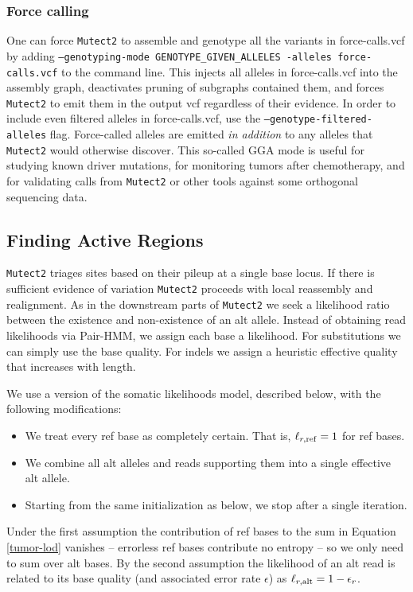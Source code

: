 \documentclass[nofootinbib,amssymb,amsmath]{revtex4}
\newcommand{\code}[1]{\texttt{#1}}
\begin{document}
\subsubsection{Force calling}
One can force \code{Mutect2} to assemble and genotype all the variants in force-calls.vcf by adding \code{--genotyping-mode GENOTYPE\_GIVEN\_ALLELES -alleles force-calls.vcf} to the command line.  This injects all alleles in force-calls.vcf into the assembly graph, deactivates pruning of subgraphs contained them, and forces \code{Mutect2} to emit them in the output vcf regardless of their evidence.  In order to include even filtered alleles in force-calls.vcf, use the \code{--genotype-filtered-alleles} flag.  Force-called alleles are emitted \textit{in addition} to any alleles that \code{Mutect2} would otherwise discover.  This so-called GGA mode is useful for studying known driver mutations, for monitoring tumors after chemotherapy, and for validating calls from \code{Mutect2} or other tools against some orthogonal sequencing data.

\subsection{Finding Active Regions}
\code{Mutect2} triages sites based on their pileup at a single base locus.  If there is sufficient evidence of variation \code{Mutect2} proceeds with local reassembly and realignment.  As in the downstream parts of \code{Mutect2} we seek a likelihood ratio between the existence and non-existence of an alt allele.  Instead of obtaining read likelihoods via Pair-HMM, we assign each base a likelihood.  For substitutions we can simply use the base quality.  For indels we assign a heuristic effective quality that increases with length.

We use a version of the somatic likelihoods model, described below, with the following modifications:
\begin{itemize}
\item We treat every ref base as completely certain.  That is, $\ell_{r,{\rm ref}} = 1$ for ref bases.
\item We combine all alt alleles and reads supporting them into a single effective alt allele.
\item Starting from the same initialization as below, we stop after a single iteration.
\end{itemize}

Under the first assumption the contribution of ref bases to the sum in Equation \ref{tumor-lod} vanishes -- errorless ref bases contribute no entropy -- so we only need to sum over alt bases.  By the second assumption the likelihood of an alt read is related to its base quality (and associated error rate $\epsilon$) as $\ell_{r,{\rm alt}} = 1 - \epsilon_r$.
\end{document}
